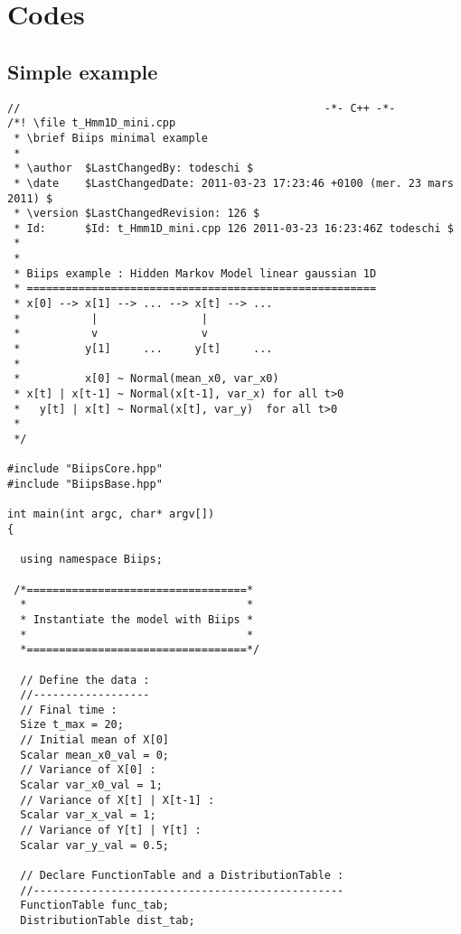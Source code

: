 \chapter{Codes}

\section{Simple example}
\label{miniex}


\begin{lstlisting}
//                                               -*- C++ -*-
/*! \file t_Hmm1D_mini.cpp
 * \brief Biips minimal example
 * 
 * \author  $LastChangedBy: todeschi $
 * \date    $LastChangedDate: 2011-03-23 17:23:46 +0100 (mer. 23 mars 2011) $
 * \version $LastChangedRevision: 126 $
 * Id:      $Id: t_Hmm1D_mini.cpp 126 2011-03-23 16:23:46Z todeschi $
 *
 *
 * Biips example : Hidden Markov Model linear gaussian 1D
 * ======================================================
 * x[0] --> x[1] --> ... --> x[t] --> ...
 *           |                |
 *           v                v
 *          y[1]     ...     y[t]     ...
 *
 *          x[0] ~ Normal(mean_x0, var_x0)
 * x[t] | x[t-1] ~ Normal(x[t-1], var_x) for all t>0
 *   y[t] | x[t] ~ Normal(x[t], var_y)  for all t>0
 *
 */

#include "BiipsCore.hpp"
#include "BiipsBase.hpp"

int main(int argc, char* argv[])
{

  using namespace Biips;

 /*==================================*
  *                                  *
  * Instantiate the model with Biips *
  *                                  *
  *==================================*/

  // Define the data :
  //------------------
  // Final time :
  Size t_max = 20;
  // Initial mean of X[0]
  Scalar mean_x0_val = 0;
  // Variance of X[0] :
  Scalar var_x0_val = 1;
  // Variance of X[t] | X[t-1] :
  Scalar var_x_val = 1;
  // Variance of Y[t] | Y[t] :
  Scalar var_y_val = 0.5;

  // Declare FunctionTable and a DistributionTable :
  //------------------------------------------------
  FunctionTable func_tab;
  DistributionTable dist_tab;


\end{lstlisting}
